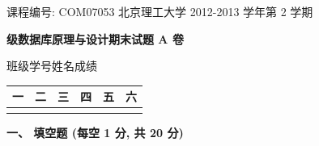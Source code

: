 \documentclass{ctexart} %
\begin{document}
\pagestyle{plain} %

\raggedright %
课程编号: COM07053 \hfill 北京理工大学 2012-2013 学年第 2 学期

\vspace{1em} %

\centering
\textbf{\fontsize{16pt}{18pt} 级数据库原理与设计期末试题 A 卷} %

\vspace{1em}

\raggedright %
班级\underline{\hspace{3cm}}\quad 学号\underline{\hspace{3cm}}\quad 姓名\underline{\hspace{3cm}}\quad 成绩\underline{\hspace{3cm}} %

\vspace{1em}

\centering
\begin{tabular}{|c|c|c|c|c|c|}
\hline
一 & 二 & 三 & 四 & 五 & 六 \\
\hline
 &  &  &  &  &  \\
\hline
\end{tabular}

\vspace{2em}

\raggedright
\textbf{\large 一、 填空题 (每空 1 分, 共 20 分)}
\vspace{1em}
\end{document}

